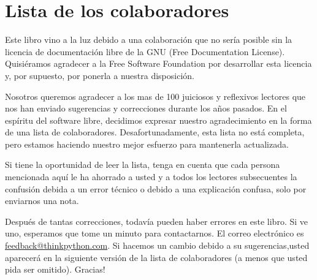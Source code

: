 


\chapter{Lista de los colaboradores}

Este libro vino a la luz debido a una colaboración que no sería posible sin 
la licencia de documentación libre de la GNU (Free Documentation License).  
Quisiéramos agradecer a la Free Software Foundation por desarrollar esta 
licencia y, por supuesto, por ponerla a nuestra disposición.

Nosotros queremos agradecer a los mas de 100 juiciosos y reflexivos lectores 
que nos han enviado sugerencias y correcciones durante los años pasados.  
En el espíritu del  software libre, decidimos expresar nuestro agradecimiento 
en la forma de una lista de colaboradores.  Desafortunadamente, esta lista no 
está completa, pero estamos haciendo nuestro mejor esfuerzo para mantenerla 
actualizada.

Si tiene la oportunidad de leer la lista, tenga en cuenta que cada persona 
mencionada aquí le ha ahorrado a usted y a todos los lectores subsecuentes  la 
confusión debida a un error técnico o debido a una explicación confusa, solo 
por enviarnos una nota.

Después de tantas correcciones, todavía pueden haber errores en este libro.  
Si ve uno, esperamos que tome un minuto para contactarnos.  El correo 
electrónico es 
\href{mailto:feedback@thinkpython.com}{feedback@thinkpython.com}. Si hacemos 
un cambio debido a su sugerencias,usted aparecerá en la siguiente versión de la 
lista de colaboradores (a menos que usted pida ser omitido). Gracias!

